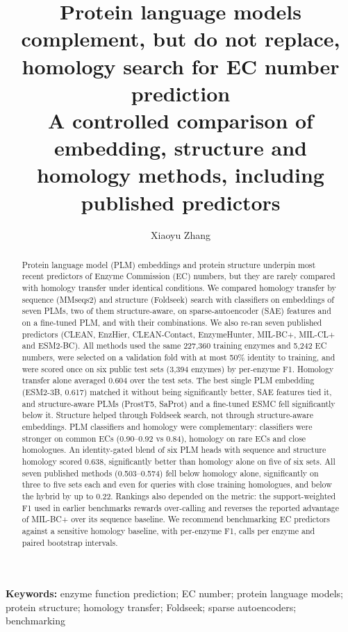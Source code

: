 \documentclass[11pt]{article}
\title{\textbf{Protein language models complement, but do not replace, homology search for EC number prediction}\\[4pt]
\large A controlled comparison of embedding, structure and homology methods, including published predictors}
\author{Xiaoyu Zhang\\[2pt]\small\todo{Affiliation; corresponding author e-mail}}
\date{}
\begin{document}
\maketitle
\linenumbers

\begin{abstract}
\noindent Protein language model (PLM) embeddings and protein structure underpin most recent predictors of Enzyme
Commission (EC) numbers, but they are rarely compared with homology transfer under identical conditions. We compared
homology transfer by sequence (MMseqs2) and structure (Foldseek) search with classifiers on embeddings of seven PLMs,
two of them structure-aware, on sparse-autoencoder (SAE) features and on a fine-tuned PLM, and with their
combinations. We also re-ran seven published predictors (CLEAN, EnzHier, CLEAN-Contact, EnzymeHunter, MIL-BC+, MIL-CL+
and ESM2-BC). All methods used
the same 227,360 training enzymes and 5,242 EC numbers, were selected on a validation fold with at most 50\% identity
to training, and were scored once on six public test sets (3,394 enzymes) by per-enzyme F1. Homology transfer alone
averaged 0.604 over the test sets. The best single PLM embedding (ESM2-3B, 0.617) matched it without being
significantly better, SAE features tied it, and structure-aware PLMs (ProstT5, SaProt) and a fine-tuned ESMC fell
significantly below it. Structure helped through Foldseek search, not through structure-aware embeddings. PLM
classifiers and homology were complementary: classifiers were stronger on common ECs (0.90--0.92 vs 0.84), homology
on rare ECs and close homologues. An identity-gated blend of six PLM heads with sequence and structure homology scored
0.638, significantly better than homology alone on five of six sets. All seven published methods (0.503--0.574) fell
below homology alone, significantly on three to five sets each and even for queries with close training homologues,
and below the hybrid by up to 0.22.
Rankings also depended on the metric: the support-weighted F1 used in earlier benchmarks rewards over-calling and
reverses the reported advantage of MIL-BC+ over its sequence baseline. We recommend benchmarking EC predictors
against a sensitive homology baseline, with per-enzyme F1, calls per enzyme and paired bootstrap intervals.
\end{abstract}

\noindent\textbf{Keywords:} enzyme function prediction; EC number; protein language models; protein structure; homology
transfer; Foldseek; sparse autoencoders; benchmarking
\end{document}
